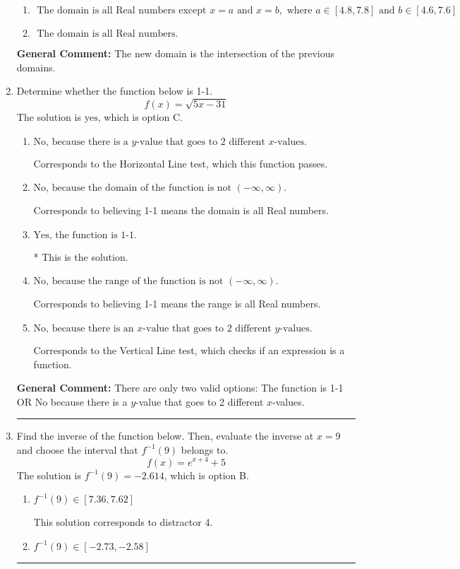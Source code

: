 \documentclass{extbook}[14pt]
\newcommand{\litem}[1]{\item #1

\rule{\textwidth}{0.4pt}}
\begin{document}
\begin{enumerate}
{\begin{enumerate}[label=\Alph*.]
\item \( \text{ The domain is all Real numbers except } x = a \text{ and } x = b, \text{ where } a \in [4.8, 7.8] \text{ and } b \in [4.6, 7.6] \)


\item \( \text{ The domain is all Real numbers. } \)


\end{enumerate}

\textbf{General Comment:} The new domain is the intersection of the previous domains.
}
\litem{
Determine whether the function below is 1-1.
\[ f(x) = \sqrt{5 x - 31} \]The solution is \( \text{yes} \), which is option C.\begin{enumerate}[label=\Alph*.]
\item \( \text{No, because there is a $y$-value that goes to 2 different $x$-values.} \)

Corresponds to the Horizontal Line test, which this function passes.
\item \( \text{No, because the domain of the function is not $(-\infty, \infty)$.} \)

Corresponds to believing 1-1 means the domain is all Real numbers.
\item \( \text{Yes, the function is 1-1.} \)

* This is the solution.
\item \( \text{No, because the range of the function is not $(-\infty, \infty)$.} \)

Corresponds to believing 1-1 means the range is all Real numbers.
\item \( \text{No, because there is an $x$-value that goes to 2 different $y$-values.} \)

Corresponds to the Vertical Line test, which checks if an expression is a function.
\end{enumerate}

\textbf{General Comment:} There are only two valid options: The function is 1-1 OR No because there is a $y$-value that goes to 2 different $x$-values.
}
\litem{
Find the inverse of the function below. Then, evaluate the inverse at $x = 9$ and choose the interval that $f^{-1}(9)$ belongs to.
\[ f(x) = e^{x+4}+5 \]The solution is \( f^{-1}(9) = -2.614 \), which is option B.\begin{enumerate}[label=\Alph*.]
\item \( f^{-1}(9) \in [7.36, 7.62] \)

 This solution corresponds to distractor 4.
\item \( f^{-1}(9) \in [-2.73, -2.58] \)


\end{enumerate}}
\end{enumerate}
\end{document}
